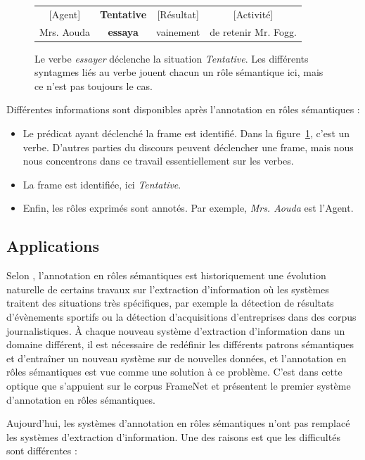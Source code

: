 \begin{figure}[ht]
    \centering
    \begin{tabular}{cccc}
    [Agent]  & \textbf{Tentative} & [Résultat]  & [Activité]         \tabularnewline
    Mrs. Aouda & \textbf{essaya}  & vainement & de retenir Mr. Fogg. \tabularnewline
    \end{tabular}
    \caption{\label{fig:introsrl}Le verbe \emph{essayer} déclenche la situation
    \emph{Tentative}.  Les différents syntagmes liés au verbe jouent chacun un
    rôle sémantique ici, mais ce n'est pas toujours le cas.}
\end{figure}

Différentes informations sont disponibles après l'annotation en rôles
sémantiques :

\begin{itemize}
    \item Le prédicat ayant déclenché la frame est identifié. Dans la
        figure~\ref{fig:introsrl}, c'est un verbe. D'autres parties du
        discours peuvent déclencher une frame, mais nous nous concentrons dans
        ce travail essentiellement sur les verbes.
    \item La frame est identifiée, ici \emph{Tentative}.
    \item Enfin, les rôles exprimés sont annotés. Par exemple, \emph{Mrs.
        Aouda} est l'Agent.
\end{itemize}

\subsection{Applications}

Selon \cite{gildea2002automatic}, l'annotation en rôles sémantiques est
historiquement une évolution naturelle de certains travaux sur l'extraction
d'information où les systèmes traitent des situations très spécifiques, par
exemple la détection de résultats d'évènements sportifs ou la détection
d'acquisitions d'entreprises dans des corpus journalistiques. À chaque nouveau
système d'extraction d'information dans un domaine différent, il est nécessaire
de redéfinir les différents patrons sémantiques et d'entraîner un nouveau
système sur de nouvelles données, et l'annotation en rôles sémantiques est vue
comme une solution à ce problème. C'est dans cette optique que
\cite{gildea2002automatic} s'appuient sur le corpus FrameNet et présentent le
premier système d'annotation en rôles sémantiques.

Aujourd'hui, les systèmes d'annotation en rôles sémantiques n'ont pas remplacé
les systèmes d'extraction d'information. Une des raisons est que les
difficultés sont différentes \citep{boros2014etiquetage} :

